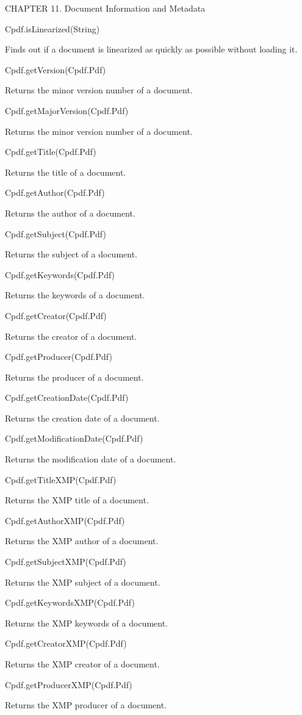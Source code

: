 CHAPTER 11. Document Information and Metadata

Cpdf.isLinearized(String)

Finds out if a document is linearized as
quickly as possible without loading it.

Cpdf.getVersion(Cpdf.Pdf)

Returns the minor version number of a document.

Cpdf.getMajorVersion(Cpdf.Pdf)

Returns the minor version number of a document.

Cpdf.getTitle(Cpdf.Pdf)

Returns the title of a document.

Cpdf.getAuthor(Cpdf.Pdf)

Returns the author of a document.

Cpdf.getSubject(Cpdf.Pdf)

Returns the subject of a document.

Cpdf.getKeywords(Cpdf.Pdf)

Returns the keywords of a document.

Cpdf.getCreator(Cpdf.Pdf)

Returns the creator of a document.

Cpdf.getProducer(Cpdf.Pdf)

Returns the producer of a document.

Cpdf.getCreationDate(Cpdf.Pdf)

Returns the creation date of a document.

Cpdf.getModificationDate(Cpdf.Pdf)

Returns the modification date of a document.

Cpdf.getTitleXMP(Cpdf.Pdf)

Returns the XMP title of a document.

Cpdf.getAuthorXMP(Cpdf.Pdf)

Returns the XMP author of a document.

Cpdf.getSubjectXMP(Cpdf.Pdf)

Returns the XMP subject of a document.

Cpdf.getKeywordsXMP(Cpdf.Pdf)

Returns the XMP keywords of a document.

Cpdf.getCreatorXMP(Cpdf.Pdf)

Returns the XMP creator of a document.

Cpdf.getProducerXMP(Cpdf.Pdf)

Returns the XMP producer of a document.

